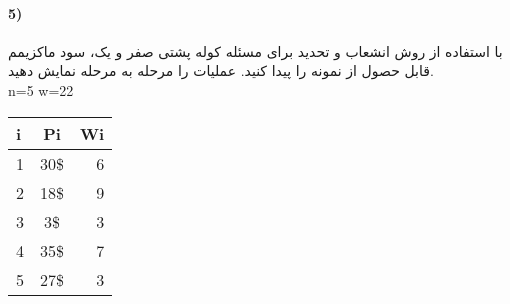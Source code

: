\documentclass[10pt,a4paper]{article}
\begin{document}
	\paragraph{5)} با استفاده از روش انشعاب و تحدید برای مسئله کوله پشتی صفر و یک، سود ماکزیمم قابل حصول از نمونه را پیدا کنید. عملیات را مرحله به مرحله نمایش دهید.\\
	n=5 \; w=22
	\begin{latin}
		\begin{center}
	 	 \begin{tabular}{ l | c | r }
			i & Pi & Wi \\ \hline
			1 & 30\$ & 6 \\ \hline
			2 & 18\$ & 9 \\ \hline
			3 & 3\$ & 3 \\ \hline
			4 & 35\$ & 7 \\ \hline
			5 & 27\$ & 3 \\ 
	 	 \end{tabular}
		\end{center}
	\end{latin}
\end{document}
